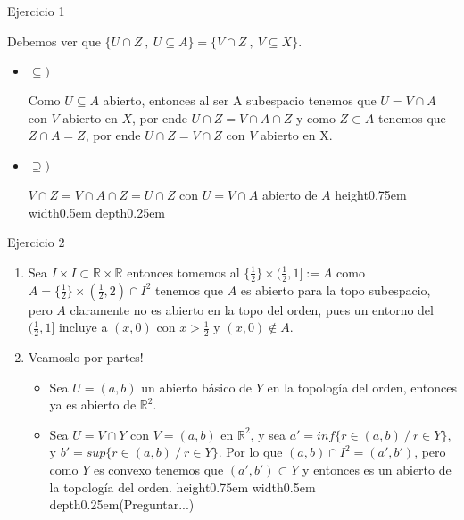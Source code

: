 \documentclass[11pt]{article}
\newcommand{\R}{{\mathbb{R}}}
\newcommand{\sett}[1]{\{#1\}}
\newenvironment{proof}[1][Demostraci\'on]{\begin{trivlist}
\item[\hskip \labelsep {\bfseries #1}]}{\end{trivlist}}
\newcommand{\qed}{\nobreak \ifvmode \relax \else
      \ifdim\lastskip<1.5em \hskip-\lastskip
      \hskip1.5em plus0em minus0.5em \fi \nobreak
      \vrule height0.75em width0.5em depth0.25em\fi}
\begin{document}
\begin{enumerate}

\item {Ejercicio 1}

\begin{proof}
Debemos ver que $\sett{U \cap Z \ , \ U \subseteq A} = \sett{V \cap Z \ , \ V \subseteq X}$.

\begin{itemize}

\item {$\subseteq)$}

Como $U \subseteq A$ abierto, entonces al ser A subespacio tenemos que $U = V \cap A$ con $V$ abierto en $X$, por ende $U \cap Z = V \cap A \cap Z$ y como $Z \subset A$ tenemos que $Z \cap A = Z$, por ende $U \cap Z = V \cap Z$ con $V$ abierto en X.

\item {$\supseteq)$}

$V \cap Z = V \cap A \cap Z = U \cap Z$ con $U = V \cap A$ abierto de $A$ \qed

\end{itemize}
\end{proof}

\item {Ejercicio 2}

\begin{proof}
\begin{enumerate}

\item Sea $I \times I \subset \R \times \R$ entonces tomemos al $\sett{\frac{1}{2}} \times (\frac{1}{2},1]:=A$ como $A = \sett{\frac{1}{2}} \times (\frac{1}{2},2) \cap I^2$ tenemos que $A$ es abierto para la topo subespacio, pero $A$ claramente no es abierto en la topo del orden, pues un entorno del $(\frac{1}{2},1]$ incluye a $(x,0)$ con $x > \frac{1}{2}$ y $(x,0) \not \in A$.

\item Veamoslo por partes!

\begin{itemize}
\item Sea $U= (a,b)$ un abierto b\'asico de $Y$ en la topolog\'ia del orden, entonces ya es abierto de $\R^2$.

\item Sea $U = V \cap Y$ con $V = (a,b)$ en $\R^2$, y sea $a' = inf \sett{r \in (a,b) \ / \ r \in Y}$, y $b' = sup \sett{r \in (a,b) \ / \ r \in Y}$. Por lo que $(a,b) \cap I^2 = (a',b')$, pero como $Y$ es convexo tenemos que $(a',b') \subset Y$ y entonces es un abierto de la topolog\'ia del orden. \qed (Preguntar...)


\end{itemize}
\end{enumerate}
\end{proof}
\end{enumerate}
\end{document}
